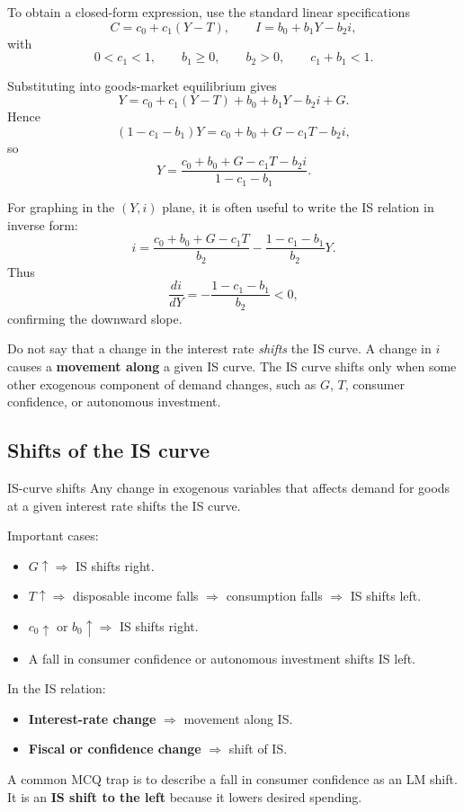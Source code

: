 To obtain a closed-form expression, use the standard linear specifications
\[
C = c_0 + c_1(Y-T),
\qquad
I = b_0 + b_1Y - b_2 i,
\]
with
\[
0<c_1<1,\qquad b_1\ge 0,\qquad b_2>0,\qquad c_1+b_1<1.
\]

\begin{keyformula}[title={Key Formula: Linear IS relation}]
Substituting into goods-market equilibrium gives
\[
Y = c_0 + c_1(Y-T) + b_0 + b_1Y - b_2 i + G.
\]
Hence
\[
(1-c_1-b_1)Y = c_0 + b_0 + G - c_1T - b_2 i,
\]
so
\[
Y
=
\frac{c_0+b_0+G-c_1T-b_2 i}{1-c_1-b_1}.
\]
\end{keyformula}

\noindent
For graphing in the $(Y,i)$ plane, it is often useful to write the IS relation in inverse form:
\[
i
=
\frac{c_0+b_0+G-c_1T}{b_2}
-
\frac{1-c_1-b_1}{b_2}Y.
\]
Thus
\[
\frac{di}{dY}
=
-\frac{1-c_1-b_1}{b_2}<0,
\]
confirming the downward slope.

\begin{commonmistake}
Do not say that a change in the interest rate \emph{shifts} the IS curve. A change in $i$ causes a \textbf{movement along} a given IS curve. The IS curve shifts only when some other exogenous component of demand changes, such as $G$, $T$, consumer confidence, or autonomous investment.
\end{commonmistake}

\subsection{Shifts of the IS curve}

\begin{definition}{IS-curve shifts}{}
Any change in exogenous variables that affects demand for goods at a given interest rate shifts the IS curve.
\end{definition}

\noindent
Important cases:
\begin{itemize}[leftmargin=1.5em]
\item $G\uparrow \Rightarrow$ IS shifts right.
\item $T\uparrow \Rightarrow$ disposable income falls $\Rightarrow$ consumption falls $\Rightarrow$ IS shifts left.
\item $c_0\uparrow$ or $b_0\uparrow \Rightarrow$ IS shifts right.
\item A fall in consumer confidence or autonomous investment shifts IS left.
\end{itemize}

\begin{examtip}[title={Exam Focus: Shift versus movement on IS}]
In the IS relation:
\begin{itemize}[leftmargin=1.5em]
\item \textbf{Interest-rate change} $\Rightarrow$ movement along IS.
\item \textbf{Fiscal or confidence change} $\Rightarrow$ shift of IS.
\end{itemize}
A common MCQ trap is to describe a fall in consumer confidence as an LM shift. It is an \textbf{IS shift to the left} because it lowers desired spending.
\end{examtip}

